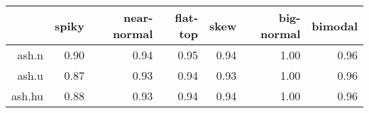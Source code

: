 \begin{tabular}{rrrrrrr}
  \toprule  & spiky & near-normal & flat-top & skew & big-normal & bimodal \\ 
  \midrule ash.n & 0.90 & 0.94 & 0.95 & 0.94 & 1.00 & 0.96 \\ 
  ash.u & 0.87 & 0.93 & 0.94 & 0.93 & 1.00 & 0.96 \\ 
  ash.hu & 0.88 & 0.93 & 0.94 & 0.94 & 1.00 & 0.96 \\ 
   \bottomrule \end{tabular}

